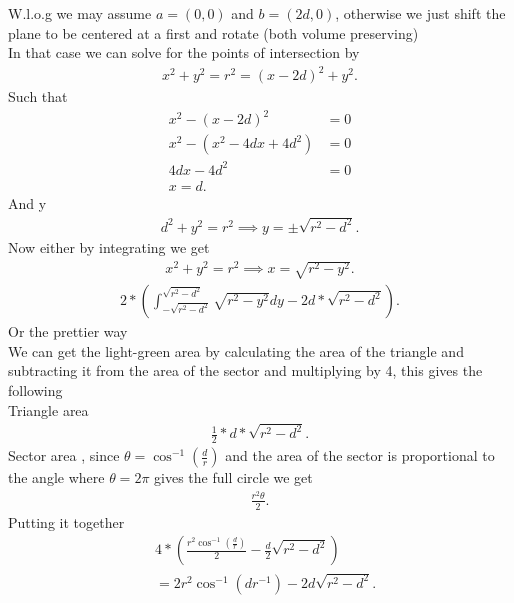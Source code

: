 \begin{solution}
  W.l.o.g we may assume $a = (0,0)$  and $b=(2d,0)$, otherwise we just shift the plane to be centered at a first and rotate (both volume preserving) \\[1ex]
  In that case we can solve for the points of intersection by 
  \begin{align*}
    x^2+y^2 = r^2 = (x-2d)^2 + y^2
  .\end{align*}
  Such that 
  \begin{align*}
    x^2 -(x-2d)^2 &= 0 \\
    x^2 -(x^2-4dx+4d^2) &= 0 \\
    4dx - 4d^2 &= 0 \\
    x = d
  .\end{align*}
  And y 
  \begin{align*}
    d^2 + y^2 = r^2 \implies y = \pm \sqrt{r^2-d^2} 
  .\end{align*}
  Now either by integrating we get 
  \begin{align*}
    x^2+y^2 = r^2 \implies x = \sqrt{r^2-y^2} 
  .\end{align*}
  \begin{align*}
    2*\left( \int_{-\sqrt{r^2-d^2} }^{\sqrt{r^2-d^2} } \sqrt{r^2-y^2}  dy - 2d*\sqrt{r^2-d^2}  \right) 
  .\end{align*}
  Or the prettier way \newpage
  \hspace{0mm}\\
  We can get the light-green area by calculating the area of the triangle and subtracting it from the area of the sector and multiplying by 4, this gives the following \\[1ex]
  Triangle area
  \begin{align*}
    \frac{1}{2} *d*\sqrt{r^2-d^2}  
  .\end{align*}
  Sector area , since $\theta = \cos^{-1}(\frac{d}{r})$ and the area of the sector is proportional to the angle where $\theta =2\pi $ 
  gives the full circle we get 
  \begin{align*}
    \frac{r^2 \theta }{2}
  .\end{align*}
  Putting it together 
  \begin{align*}
    &4*\left(\frac{r^2 \cos^{-1}(\frac{d}{r})}{2} -  \frac{d}{2}\sqrt{r^2-d^2} \right)\\
    &=2r^2\cos^{-1}(dr^{-1}) - 2d\sqrt{r^2-d^2} 
  .\end{align*}
  \begin{center}
    \begin{figure}[H] 

\end{figure}
\end{center}
\end{solution}
